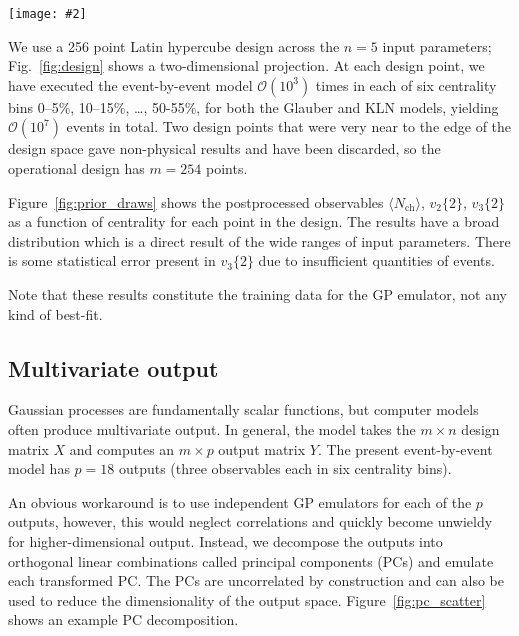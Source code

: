 \documentclass[aps,prc,reprint,superscriptaddress,amsmath]{revtex4-1}
\newcommand{\widefig}[3][t]{
  \begin{figure*}[#1]
    \texttt{[image: \#2]}
    \caption{\label{fig:#2}#3}
  \end{figure*}
}
\newcommand{\avg}[1]{\langle #1 \rangle}
\newcommand{\nch}{N_\text{ch}}
\newcommand{\vnk}[2]{v_#1\{#2\}}
\newcommand{\order}[1]{$\mathcal O(10^{#1})$}
\begin{document}
\widefig{prior_draws}{
  Model calculations from Glauber (top, blue) and KLN (bottom, green) initial conditions.
  Each plot has 254 lines corresponding to the 254 Latin hypercube design points.
  From left to right:
  average charged-particle multiplicity $\avg\nch$,
  elliptic flow two-particle cumulant $\vnk 2 2$,
  and triangular flow two-particle cumulant $\vnk 3 2$.
  Data points are experimental measurements from ALICE \cite{Abelev:2014mda}.
}

We use a 256 point Latin hypercube design across the $n = 5$ input parameters; Fig.~\ref{fig:design} shows a two-dimensional projection.
At each design point, we have executed the event-by-event model \order 3 times in each of six centrality bins 0--5\%, 10--15\%, \ldots, 50-55\%, for both the Glauber and KLN models, yielding \order 7 events in total.
Two design points that were very near to the edge of the design space gave non-physical results and have been discarded, so the operational design has $m = 254$ points.

Figure~\ref{fig:prior_draws} shows the postprocessed observables $\avg\nch$, $\vnk 2 2$, $\vnk 3 2$ as a function of centrality for each point in the design.
The results have a broad distribution which is a direct result of the wide ranges of input parameters.
There is some statistical error present in $\vnk 3 2$ due to insufficient quantities of events.

Note that these results constitute the training data for the GP emulator, not any kind of best-fit.

\subsection{\label{sec:multiout}Multivariate output}

Gaussian processes are fundamentally scalar functions, but computer models often produce multivariate output.
In general, the model takes the $m \times n$ design matrix $X$ and computes an $m \times p$ output matrix $Y$.
The present event-by-event model has $p = 18$ outputs (three observables each in six centrality bins).

An obvious workaround is to use independent GP emulators for each of the $p$ outputs, however, this would neglect correlations and quickly become unwieldy for higher-dimensional output.
Instead, we decompose the outputs into orthogonal linear combinations called principal components (PCs) and emulate each transformed PC.
The PCs are uncorrelated by construction and can also be used to reduce the dimensionality of the output space.
Figure~\ref{fig:pc_scatter} shows an example PC decomposition.
\end{document}
